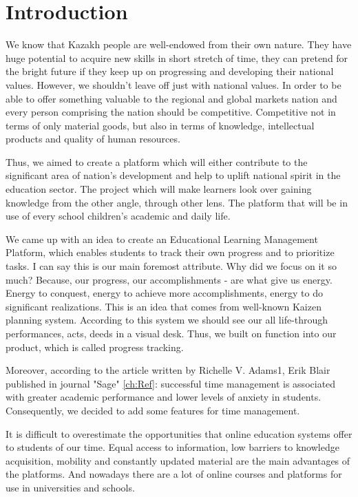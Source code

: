\chapter{Introduction}\label{ch:intro}
We know that Kazakh people are well-endowed from their own nature. They have huge potential to acquire new skills in short stretch of time, they can pretend for the bright future if they keep up on progressing and developing their national values. However, we shouldn't leave off just with national values. In order to be able to offer something valuable to the regional and global markets nation and every person comprising the nation should be competitive. Competitive not in terms of only material goods, but also in terms of knowledge, intellectual products and quality of human resources. 

Thus, we aimed to create a platform which will either contribute to the significant area of nation's development and help to uplift national spirit in the education sector. The project which will make learners look over gaining knowledge from the other angle, through other lens. The platform that will be in use of every school children's academic and daily life.

We came up with an idea to create an Educational Learning Management Platform, which enables students to track their own progress and to prioritize tasks. I can say this is our main foremost attribute. Why did we focus on it so much? Because, our progress, our accomplishments - are what give us energy. Energy to conquest, energy to achieve more accomplishments, energy to do significant realizations. This is an idea that comes from well-known Kaizen planning system. According to this system we should see our all life-through performances, acts, deeds in a visual desk.\cite{singh2009kaizen} Thus, we built on function into our product, which is called progress tracking.

Moreover, according to the article written by Richelle V. Adams1, Erik Blair published in journal "Sage" \ref{ch:Ref}: successful time management is associated with greater academic performance and lower levels of anxiety in students. Consequently, we decided to add some features for time management. 

It is difficult to overestimate the opportunities that online education systems offer to students of our time. Equal access to information, low barriers to knowledge acquisition, mobility and constantly updated material are the main advantages of the platforms. And nowadays there are a lot of online courses and platforms for use in universities and schools. 

